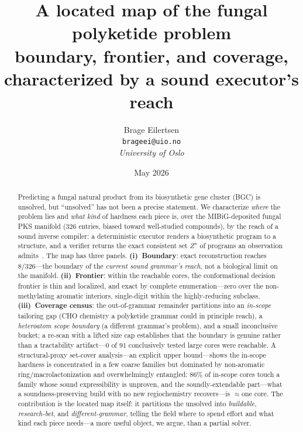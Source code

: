 \documentclass[11pt]{article}
\title{\textbf{A located map of the fungal polyketide problem}\\[2pt]
\large boundary, frontier, and coverage, characterized by a sound executor's reach}
\author{Brage Eilertsen\\
\small \texttt{brageei@uio.no}\\
\small \textit{University of Oslo}}
\date{May 2026}
\newcommand{\zstar}{$Z^\star$}
\begin{document}
\maketitle

\begin{abstract}
Predicting a fungal natural product from its biosynthetic gene cluster (BGC) is unsolved, but
``unsolved'' has not been a precise statement. We characterize \emph{where} the problem lies and
\emph{what kind} of hardness each piece is, over the MIBiG-deposited fungal PKS manifold ($326$
entries, biased toward well-studied compounds), by the reach of a sound inverse compiler: a
deterministic executor renders a biosynthetic program to a structure, and a verifier returns the
exact consistent set \zstar{} of programs an observation admits~\citep{eilertsen2026preprint}.
The map has three panels. \textbf{(i)~Boundary}: exact reconstruction reaches $8/326$---the boundary
of the \emph{current sound grammar's reach}, not a biological limit on the manifold. \textbf{(ii)~Frontier}:
within the reachable cores, the conformational decision frontier is thin and localized, and exact by
complete enumeration---zero over the non-methylating aromatic interiors, single-digit within the
highly-reducing subclass. \textbf{(iii)~Coverage census}: the out-of-grammar remainder partitions
into an \emph{in-scope} tailoring gap (CHO chemistry a polyketide grammar could in principle reach),
a \emph{heteroatom scope boundary} (a different grammar's problem), and a small inconclusive bucket;
a re-scan with a lifted size cap establishes that the boundary is genuine rather than a tractability
artifact---$0$ of $91$ conclusively tested large cores were reachable. A structural-proxy set-cover
analysis---an explicit upper bound---shows the in-scope hardness is concentrated in a few coarse
families but dominated by non-aromatic ring/macrolactonization and overwhelmingly entangled: $86\%$ of
in-scope cores touch a family whose sound expressibility is unproven, and the soundly-extendable
part---what a soundness-preserving build with no new regiochemistry recovers---is $\approx$one core. The contribution is the located map itself: it partitions the unsolved into \emph{buildable},
\emph{research-bet}, and \emph{different-grammar}, telling the field where to spend effort and what
kind each piece needs---a more useful object, we argue, than a partial solver.
\end{abstract}

\end{document}

